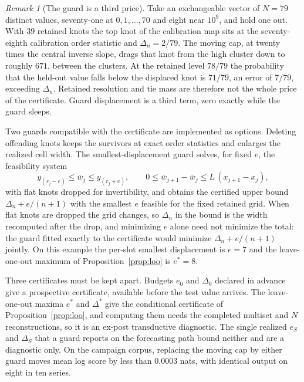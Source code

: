 \documentclass[11pt]{article}
\theoremstyle{remark}
\newtheorem{remark}[proposition]{Remark}
\begin{document}
\begin{remark}[The guard is a third price]\label{rem:guard}
Take an exchangeable vector of $N = 79$ distinct values, seventy-one at
$0, 1, \dots, 70$ and eight near $10^9$, and hold one out. With $39$ retained knots
the top knot of the calibration map sits at the seventy-eighth calibration order
statistic and $\Delta_n = 2/79$. The moving cap, at twenty times the central inverse
slope, drags that knot from the high cluster down to roughly $671$, between the
clusters. At the retained level $78/79$ the probability that the held-out value falls
below the displaced knot is $71/79$, an error of $7/79$, exceeding $\Delta_n$.
Retained resolution and tie mass are therefore not the whole price of the
certificate. Guard displacement is a third term, zero exactly while the guard sleeps.

Two guards compatible with the certificate are implemented as options. Deleting
offending knots keeps the survivors at exact order statistics and enlarges the
realized cell width. The smallest-displacement guard solves, for fixed $e$, the
feasibility system
\[
  y_{(r_j - e)} \le \bar w_j \le y_{(r_j + e)}, \qquad
  0 \le \bar w_{j+1} - \bar w_j \le L\,(x_{j+1} - x_j),
\]
with flat knots dropped for invertibility, and obtains the certified upper bound
$\Delta_n + e/(n+1)$ with the smallest $e$ feasible for the fixed retained grid.
When flat knots are dropped the grid changes, so $\Delta_n$ in the bound is the
width recomputed after the drop, and minimizing $e$ alone need not minimize the
total: the guard fitted exactly to the certificate would minimize
$\Delta_n + e/(n+1)$ jointly. On this example the per-slot smallest displacement is
$e = 7$ and the leave-one-out maximum of Proposition~\ref{prop:loo} is $e^* = 8$.

Three certificates must be kept apart. Budgets $e_0$ and $\Delta_0$ declared in
advance give a prospective certificate, available before the test value arrives.
The leave-one-out maxima $e^*$ and $\Delta^*$ give the conditional certificate of
Proposition~\ref{prop:loo}, and computing them needs the completed multiset and $N$
reconstructions, so it is an ex-post transductive diagnostic. The single realized
$e_S$ and $\Delta_S$ that a guard reports on the forecasting path bound neither and
are a diagnostic only.
On the campaign corpus, replacing the moving cap by either guard moves mean log score
by less than $0.0003$ nats, with identical output on eight in ten series.
\end{remark}
\end{document}
